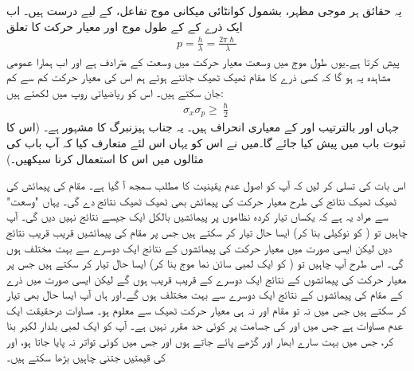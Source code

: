  یہ حقائق ہر موجی مظہر، بشمول کوانٹائی میکانی موج تفاعل، کے لیے درست ہیں۔ اب ایک ذرے کے  کے طول موج اور  معیار حرکت کا تعلق  
\begin{align}\label{مساوات_تفاعل_موج_ڈی_بروگلی_معیار_حرکت}
p=\frac{h}{\lambda}=\frac{2\pi\hslash}{\lambda}
\end{align}
پیش کرتا ہے۔یوں طول موج میں وسعت  معیار حرکت میں  وسعت  کے مترادف  ہے اور  اب ہمارا عمومی مشاہدہ  یہ  ہو گا کہ کسی ذرے کا مقام ٹھیک ٹھیک جانتے ہوئے ہم اس کی معیار حرکت  کم سے کم  جان سکتے ہیں۔ اس کو ریاضیاتی روپ میں لکھتے ہیں:
\begin{align}\label{مساوات_تفاعل_موج_اصول_عدم_یقینیت}
\sigma_{x}\sigma_{p}\ge\frac{\hslash}{2}
\end{align}
جہاں  اور  بالترتیب  اور  کے معیاری انحراف ہیں۔ یہ جناب ہیزنبرگ کا مشہور   ہے۔ (اس کا ثبوت  باب  میں پیش کیا جائے گا۔میں نے اس کو یہاں اس لئے متعارف کیا کہ آپ باب  کی مثالوں میں اس کا استعمال کرنا سیکھیں۔)

 اس بات کی تسلی کر لیں کہ آپ کو اصول عدم یقینیت کا مطلب سمجھ آ گیا ہے۔  مقام کی پیمائش کی ٹھیک ٹھیک نتائج کی طرح معیار حرکت کی پیمائش بھی ٹھیک ٹھیک نتائج دے گی۔ یہاں  "وسعت" سے مراد یہ ہے کہ یکساں تیار کردہ  نظاموں پر پیمائشیں  بالکل ایک جیسے نتائج  نہیں دیں گی۔  آپ چاہیں تو ( کو نوکیلی بنا کر) ایسا حال تیار کر سکتے ہیں جس پر مقام کی پیمائشیں قریب قریب نتائج  دیں لیکن ایسی صورت میں معیار حرکت کی پیمائشوں کے نتائج ایک دوسرے سے بہت مختلف ہوں گی۔ اس طرح آپ چاہیں تو ( کو ایک لمبی سائن نما موج بنا کر) ایسا حال تیار کر سکتے ہیں جس پر معیار حرکت کی پیمائشوں کے نتائج ایک دوسرے کے قریب قریب ہوں گے لیکن ایسی صورت میں ذرے کے مقام کی پیمائشوں کے نتائج ایک دوسرے سے بہت مختلف ہوں گے۔اور ہاں آپ ایسا حال بھی تیار کر سکتے ہیں جس میں نہ تو مقام  اور نہ  ہی معیار حرکت ٹھیک سے معلوم ہو۔ مساوات  درحقیقت ایک عدم مساوات ہے جس میں  اور  کی جسامت پر کوئی حد مقرر نہیں ہے۔ آپ  کو ایک لمبی بلدار لکیر بنا کر، جس میں بہت سارے ابھار اور گڑھے پائے جاتے ہوں اور جس میں کوئی تواتر نہ پایا جاتا ہو،  اور  کی قیمتیں جتنی چاہیں بڑھا سکتے ہیں۔

